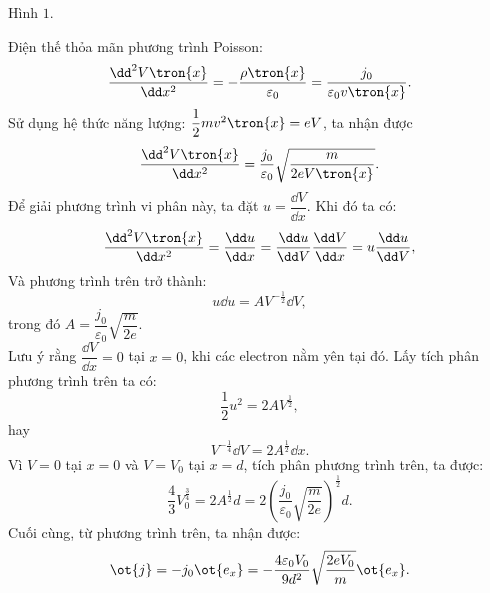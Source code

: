 \begin{loigiai}
\begin{center}
\end{center}
\begin{center}
    Hình $1$.
\end{center}
Điện thế thỏa mãn phương trình Poisson:
$$\dfrac{\dd^2 V\tron{x}}{\dd x^2}=-\dfrac{\rho\tron{x}}{\varepsilon_0}=\dfrac{j_0}{\varepsilon_0 v\tron{x}}.$$
Sử dụng hệ thức năng lượng: $\dfrac{1}{2}mv^2\tron{x}=eV$, ta nhận được
$$\dfrac{\dd^2 V\tron{x}}{\dd x^2}=\dfrac{j_0}{\varepsilon_0}\sqrt{\dfrac{m}{2eV\tron{x}}}.$$
Để giải phương trình vi phân này, ta đặt $u=\dfrac{\dd V}{\dd x}.$ Khi đó ta có:
$$\dfrac{\dd^2 V\tron{x}}{\dd x^2}=\dfrac{\dd u}{\dd x}=\dfrac{\dd u}{\dd V}\dfrac{\dd V}{\dd x}=u\dfrac{\dd u}{\dd V},$$
Và phương trình trên trở thành:
$$u\dd u=AV^{-\frac{1}{2}}\dd V,$$
trong đó $A=\dfrac{j_0}{\varepsilon_0}\sqrt{\dfrac{m}{2e}}$.
\\Lưu ý rằng $\dfrac{\dd V}{\dd x}=0$ tại $x=0$, khi các electron nằm yên tại đó. Lấy tích phân phương trình trên ta có:
$$\dfrac{1}{2}u^2=2AV^{\frac{1}{2}},$$
hay
$$V^{-\frac{1}{4}}\dd V=2A^{\frac{1}{2}}\dd x.$$
Vì $V=0$ tại $x=0$ và $V=V_0$ tại $x=d$, tích phân phương trình trên, ta được:
$$\dfrac{4}{3} V_{0}^{\frac{3}{4}}=2 A^{\frac{1}{2}} d=2\left(\dfrac{j_{0}}{\varepsilon_{0}} \sqrt{\dfrac{m}{2 e}}\right)^{\frac{1}{2}} d.$$
Cuối cùng, từ phương trình trên, ta nhận được:
$$\ot{j}=-j_0\ot{e_x}=-\dfrac{4\varepsilon_0V_0}{9d^2}\sqrt{\dfrac{2eV_0}{m}}\ot{e_x}.$$
\end{loigiai}


